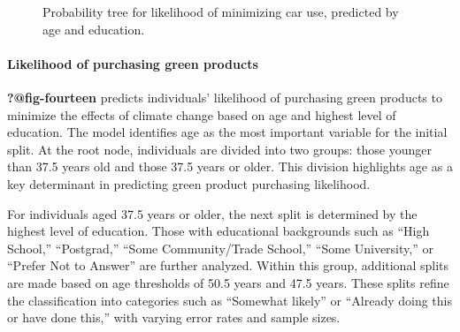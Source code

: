 \documentclass[
  letterpaper,
  DIV=11,
  numbers=noendperiod]{scrartcl}
\let\oldparagraph\paragraph
\renewcommand{\paragraph}[1]{\oldparagraph{#1}\mbox{}}
\begin{document}
\begin{figure}


\caption{\label{fig-thirteen}Probability tree for likelihood of
minimizing car use, predicted by age and education.}

\end{figure}%

\paragraph{Likelihood of purchasing green
products}\label{likelihood-of-purchasing-green-products}

\textbf{?@fig-fourteen} predicts individuals' likelihood of purchasing
green products to minimize the effects of climate change based on age
and highest level of education. The model identifies age as the most
important variable for the initial split. At the root node, individuals
are divided into two groups: those younger than 37.5 years old and those
37.5 years or older. This division highlights age as a key determinant
in predicting green product purchasing likelihood.

For individuals aged 37.5 years or older, the next split is determined
by the highest level of education. Those with educational backgrounds
such as ``High School,'' ``Postgrad,'' ``Some Community/Trade School,''
``Some University,'' or ``Prefer Not to Answer'' are further analyzed.
Within this group, additional splits are made based on age thresholds of
50.5 years and 47.5 years. These splits refine the classification into
categories such as ``Somewhat likely'' or ``Already doing this or have
done this,'' with varying error rates and sample sizes.
\end{document}
